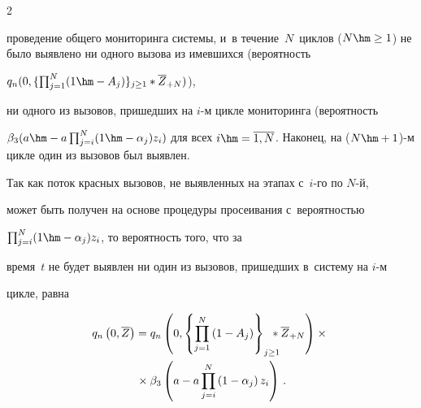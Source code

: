 \begin{multicols}{2}
\begin{enumerate}
проведение общего мониторинга системы, и~в течение~$N$~циклов ($N\hm\geq 


1$) не было выявлено ни одного вызова из имевшихся (вероятность 


$q_n(0,\{\prod\nolimits^N_{j=1} (1\hm-A_j)\}_{j\geq1} * \overline{Z}_{+N})$), 


ни одного из вызовов, пришедших на $i$-м цикле мониторинга (вероятность 


$\beta_3(a\hm- a\prod\nolimits^N_{j=i} (1\hm- \alpha_j)z_i)$ для всех $i\hm= 


\overline{1,N}$. Наконец, на ($N\hm+1$)-м цикле один из вызовов был выявлен. 


Так как поток красных вызовов, не выявленных на этапах с~$i$-го по $N$-й, 


может быть получен на основе процедуры просеивания с~вероятностью 


$\prod\nolimits^N_{j=i} (1\hm- \alpha_j)z_i$, то вероятность того, что за 


время~$t$ не будет выявлен ни один из вызовов, пришедших в~сис\-те\-му на $i$-м 


цикле, равна





\vspace*{-10pt}





\noindent


\begin{multline*}


  \hspace*{-1pt}q_n\left(0,\overline{Z}\right) =q_n\left(0, \left\{ \prod\limits^N_{j=1} \left(1-


A_j\right)\right\}_{j\geq1}\hspace*{-9pt} * \overline{Z}_{+N}\right) \times{}\\


{}\times\beta_3 \left( 


a-a\prod\limits^N_{j=i} \left(1-\alpha_j\right) z_i\right)\,.


\end{multline*}


  \end{enumerate}


  


  \vspace*{-6pt}



\end{multicols}
